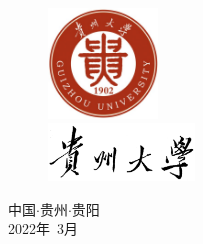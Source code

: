 \documentclass[pdftex,notypeinfo,twoside,openany,UTF8,fntef]{CASthesis}
\numberwithin{algorithm}{chapter}
\theoremstyle{THrm}{
	\newtheorem{question}{问题}[section]
    \newtheorem{problem}{问题}[section]
	\newtheorem{property}{性质}[section]
	\newtheorem{assumption}{假设}[section]
	\newtheorem{claim}[lemma]{断言}
}
\begin{document}
\vspace*{30pt}
\begin{center}
	\begin{figure}[h]
		\centering
		\includegraphics[width=2.9cm]{gzdx_red.jpg}\\
		\includegraphics[width=3.9cm]{gzdx_mao.jpg}\\
	\end{figure}
	\kaishu{}
\end{center}

\vspace*{20pt}
\begin{center}
	\heiti{}
\end{center}

\vspace*{20pt}
\begin{center}
	\heiti{}
\end{center}

\vspace*{70pt}

\begin{center}
	\heiti{}
	{中国$\cdot$贵州$\cdot$贵阳\\2022年~3月}
\end{center}

\frontmatter%



\tableofcontents
\end{document}
